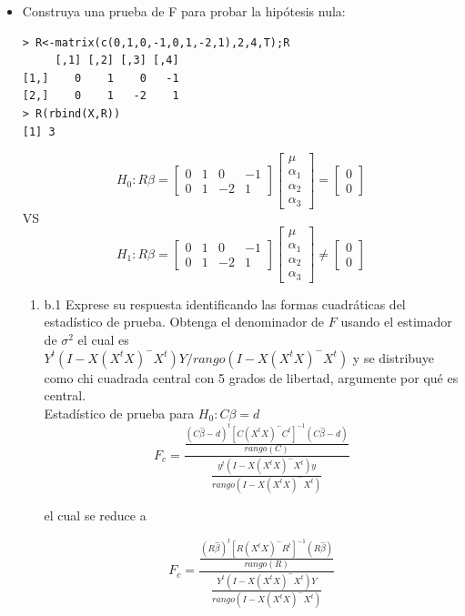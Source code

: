\documentclass[12pt,a4paper]{report}
\begin{document}
\begin{itemize}
\item Construya una prueba de F para probar la hipótesis nula:
\begin{verbatim}
> R<-matrix(c(0,1,0,-1,0,1,-2,1),2,4,T);R
     [,1] [,2] [,3] [,4]
[1,]    0    1    0   -1
[2,]    0    1   -2    1
> R(rbind(X,R))
[1] 3
\end{verbatim}
$$ H_0: R\beta=\begin{bmatrix}
0 & 1 & 0 & -1 \\
0 & 1 & -2 & 1
\end{bmatrix}\begin{bmatrix}
\mu \\ \alpha_1 \\ \alpha_2 \\ \alpha_3
\end{bmatrix}= \begin{bmatrix} 0 \\ 0 \end{bmatrix}$$
VS
$$ H_1: R\beta=\begin{bmatrix}
0 & 1 & 0 & -1 \\
0 & 1 & -2 & 1
\end{bmatrix}\begin{bmatrix}
\mu \\ \alpha_1 \\ \alpha_2 \\ \alpha_3
\end{bmatrix}\neq \begin{bmatrix} 0 \\ 0 \end{bmatrix}$$
\begin{enumerate}
\item b.1 Exprese su respuesta identificando las formas cuadráticas del estadístico de prueba. Obtenga el denominador de $F$ usando el estimador de $\sigma^2$ el cual es \\
 $Y^t(I-X(X^tX)^-X^t)Y/rango(I-X(X^tX)^-X^t)$ y se distribuye como chi cuadrada central con 5 grados de libertad, argumente por qué es central.\\ 
Estadístico de prueba para $H_0 : C\beta = d$
\[F_c = \frac{\frac{(C\widehat{\beta}-d)^t[C(X^tX)^{-}C^t]^{-1}(C\widehat{\beta}-d)}{rango(C)}}{\frac{y^t(I - X(X^tX)^{-}X^t)y}{rango(I - X(X^tX)^{-}X^t)}}\]

el cual se reduce a

\[F_c = \frac{\frac{(R\widehat{\beta})^t[R(X^tX)^{-}R^t]^{-1}(R\widehat{\beta})}{rango(R)}}{\frac{Y^t(I - X(X^tX)^{-}X^t)Y}{rango(I - X(X^tX)^{-}X^t)}}\]


\end{enumerate}
\end{itemize}
\end{document}
